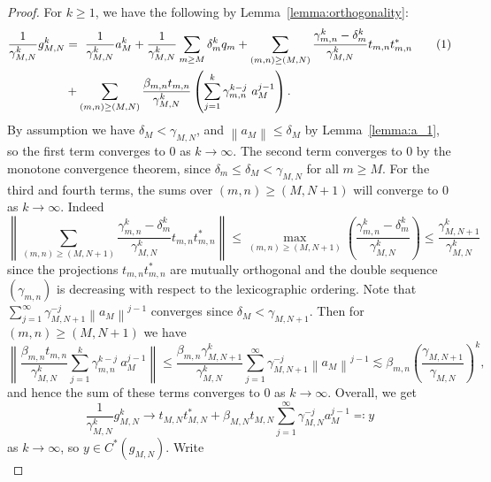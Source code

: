 \documentclass[10pt,a4paper]{amsart}
\newcommand{\norm}[1]{\left\|#1\right\|} %
\newcommand\numberthis{\addtocounter{equation}{1}\tag{\theequation}}
\begin{document}
\begin{proof}
    For $k \ge 1$, we have the following by Lemma~\ref{lemma:orthogonality}:
    \begin{align*}
    \frac{1}{\gamma_{M,N}^k}g_{M,N}^k &= \ 
    \frac{1}{\gamma_{M,N}^k}a_M^k 
    + \frac{1}{\gamma_{M,N}^k} \sum_{m \ge M} \delta_m^k q_m + \sum_{(m,n) \ge (M,N)} \frac{\gamma_{m,n}^k-\delta_m^k}{\gamma_{M,N}^k} t_{m,n}t_{m,n}^*\numberthis\\
    &+ \sum_{(m,n) \ge (M,N)} \frac{\beta_{m,n} t_{m,n} }{\gamma_{M,N}^k} \left( \sum_{j=1}^{k} \gamma_{m,n}^{k-j} \ a_M^{j-1} \right).
    \end{align*}
    By assumption we have $\delta_M < \gamma_{M,N}$, and $\norm{a_M} \le \delta_M$ by Lemma~\ref{lemma:a_1}, so the first term converges to $0$ as $k \to \infty$. The second term converges to 0 by the monotone convergence theorem, since $\delta_m \le \delta_M < \gamma_{M,N}$ for all $m \ge M$. For the third and fourth terms, the sums over $(m,n) \ge (M, N+1)$ will converge to 0 as $k \to \infty$. Indeed
    \begin{equation}
    \norm{\sum_{(m,n) \ge (M,N+1)} \frac{\gamma_{m,n}^k-\delta_m^k}{\gamma_{M,N}^k} t_{m,n}t_{m,n}^*}
    \le \max_{(m,n) \ge (M,N+1)} \left( \frac{\gamma_{m,n}^k-\delta_m^k}{\gamma_{M,N}^k}\right)
    \le \frac{\gamma_{M,N+1}^k}{\gamma_{M,N}^k}
    \end{equation}
    since the projections $t_{m,n}t_{m,n}^*$ are mutually orthogonal and the double sequence $(\gamma_{m,n})$ is decreasing with respect to the lexicographic ordering. Note that $\sum_{j=1}^\infty \gamma_{M,N+1}^{-j} \norm{a_M}^{j-1}$ converges since $\delta_M < \gamma_{M,N+1}$. Then for $(m,n) \ge (M,N+1)$ we have
    \begin{equation}
    \norm{\frac{\beta_{m,n} t_{m,n}}{\gamma_{M,N}^k} \sum_{j=1}^{k} \gamma_{m,n}^{k-j} \ a_M^{j-1}} \le \frac{\beta_{m,n} \gamma_{M,N+1}^k}{\gamma_{M,N}^k} \sum_{j=1}^\infty \gamma_{M,N+1}^{-j} \norm{a_M}^{j-1} \lesssim \beta_{m,n} \left(\frac{\gamma_{M,N+1}}{\gamma_{M,N}}\right)^k,
    \end{equation}
    and hence the sum of these terms converges to 0 as $k \to \infty$. 
    Overall, we get
    \begin{equation}\label{eq:converge-to-y}
    \frac{1}{\gamma_{M,N}^k}g_{M,N}^k \to t_{M,N}t_{M,N}^* + \beta_{M,N} t_{M,N} \sum_{j=1}^\infty \gamma_{M,N}^{-j} a_M^{j-1} \eqqcolon y
    \end{equation}
    as $k \to \infty$, so $y \in C^*(g_{M,N})$. Write
    \begin{equation}

\end{equation}
\end{proof}
\end{document}
